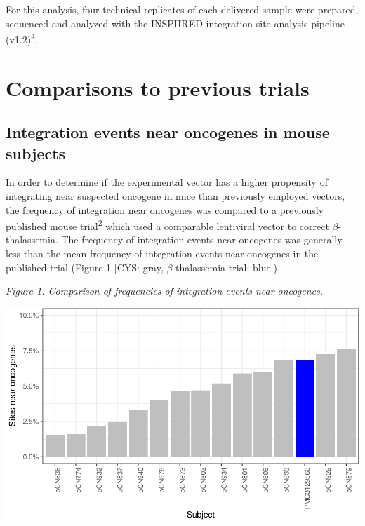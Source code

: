 \documentclass[12pt,]{article}
\begin{document}
For this analysis, four technical replicates of each delivered sample
were prepared, sequenced and analyzed with the INSPIIRED integration
site analysis pipeline (v1.2)\textsuperscript{4}.

\newpage

\section{Comparisons to previous
trials}\label{comparisons-to-previous-trials}

\subsection{Integration events near oncogenes in mouse
subjects}\label{integration-events-near-oncogenes-in-mouse-subjects}

\vspace{0.1cm}

In order to determine if the experimental vector has a higher propensity
of integrating near suspected oncogene in mice than previously employed
vectors, the frequency of integration near oncogenes was compared to a
previously published mouse trial\textsuperscript{2} which used a
comparable lentiviral vector to correct \(\beta\)-thalassemia. The
frequency of integration events near oncogenes was generally less than
the mean frequency of integration events near oncogenes in the published
trial (Figure 1 {[}CYS: gray, \(\beta\)-thalassemia trial: blue{]}).

\vspace{1.0cm}

\emph{Figure 1. Comparison of frequencies of integration events near
oncogenes.}

\includegraphics{project.group2_files/figure-latex/fig1-1.pdf}
\end{document}
